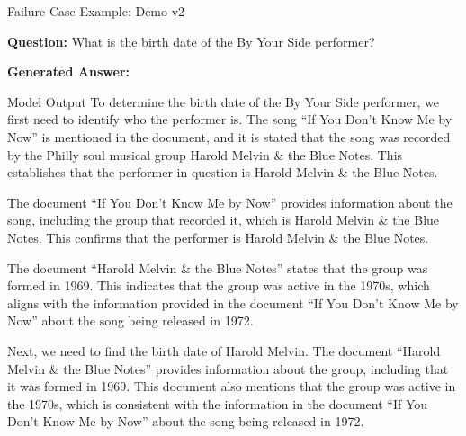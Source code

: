 \begin{frame}{Failure Case Example: Demo v2}

\small

\textbf{Question:} What is the birth date of the By Your Side performer?

\vspace{0.1cm}

\textbf{Generated Answer:}

\vspace{0.1cm}

\begin{block}{Model Output}
    \tiny
    To determine the birth date of the By Your Side performer,
    we first need to identify who the performer is. The song
    ``If You Don't Know Me by Now'' is mentioned in the document,
    and it is stated that the song was recorded by the Philly soul
    musical group Harold Melvin \& the Blue Notes. This establishes
    that the performer in question is Harold Melvin \& the Blue Notes.

    \vspace{0.08cm}

    The document ``If You Don't Know Me by Now'' provides information
    about the song, including the group that recorded it, which is
    Harold Melvin \& the Blue Notes. This confirms that the performer
    is Harold Melvin \& the Blue Notes.

    \vspace{0.08cm}

    The document ``Harold Melvin \& the Blue Notes'' states that
    the group was formed in 1969. This indicates that the group
    was active in the 1970s, which aligns with the information
    provided in the document ``If You Don't Know Me by Now'' about
    the song being released in 1972.

    \vspace{0.08cm}

    Next, we need to find the birth date of Harold Melvin. The document
    ``Harold Melvin \& the Blue Notes'' provides information about
    the group, including that it was formed in 1969. This document
    also mentions that the group was active in the 1970s, which is
    consistent with the information in the document ``If You Don't
    Know Me by Now'' about the song being released in 1972.

    \vspace{0.08cm}


\end{block}
\end{frame}
